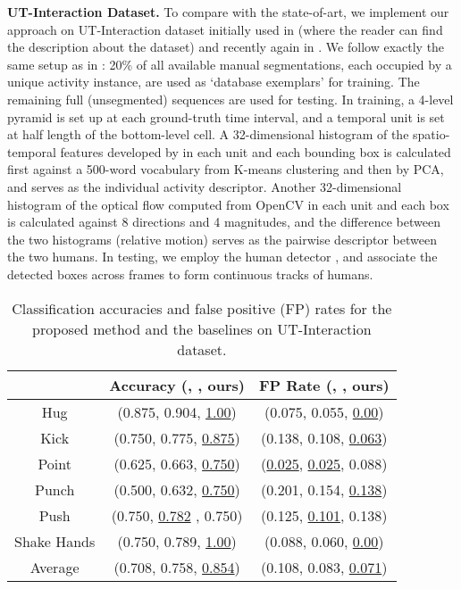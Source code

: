 \noindent\textbf{UT-Interaction Dataset.} To compare with the state-of-art, we implement our approach on UT-Interaction dataset initially used in \cite{Ryoo:group} (where the reader can find the description about the dataset) and recently again in \cite{Amer:group}. We follow exactly the same setup as in \cite{Ryoo:group,Amer:group}: 20\% of all available manual segmentations, each occupied by a unique activity instance, are used as `database exemplars' for training. The remaining full (unsegmented) sequences are used for testing. In training, a 4-level pyramid is set up at each ground-truth time interval, and a temporal unit is set at half length of the bottom-level cell. A 32-dimensional histogram of the spatio-temporal features developed by \cite{Dollar:STIP} in each unit and each bounding box is calculated first against a 500-word vocabulary from K-means clustering and then by PCA, and serves as the individual activity descriptor. Another 32-dimensional histogram of the optical flow computed from OpenCV in each unit and each box is calculated against 8 directions and 4 magnitudes, and the difference between the two histograms (relative motion) serves as the pairwise descriptor between the two humans. In testing, we employ the human detector \cite{Pedro:detect}, and associate the detected boxes across frames to form continuous tracks of humans. 

\begin{table}[ht]
\centering \caption{Classification accuracies and false positive (FP) rates for the proposed method and the baselines on UT-Interaction dataset.}
\footnotesize{
\begin{tabular}{|c||c|c|}
\hline   & Accuracy (\cite{Ryoo:group}, \cite{Amer:group}, ours) & FP Rate (\cite{Ryoo:group}, \cite{Amer:group}, ours) \\
\hline Hug &  (0.875, 0.904, \underline{1.00}) & (0.075, 0.055, \underline{0.00}) \\
\hline Kick &  (0.750, 0.775, \underline{0.875})  & (0.138, 0.108, \underline{0.063})\\
\hline Point & (0.625, 0.663,  \underline{0.750}) & (\underline{0.025}, \underline{0.025}, 0.088)\\
\hline Punch & (0.500, 0.632, \underline{0.750})  & (0.201, 0.154,  \underline{0.138})\\
\hline Push & (0.750, \underline{0.782} , 0.750)  & (0.125, \underline{0.101},  0.138)\\
\hline Shake Hands &  (0.750, 0.789, \underline{1.00}) & (0.088, 0.060, \underline{0.00}) \\
\hline\hline Average &  (0.708, 0.758, \underline{0.854})  & (0.108, 0.083,  \underline{0.071})\\
\hline 
\end{tabular}
}
\label{UTaccuFP}
\end{table}


